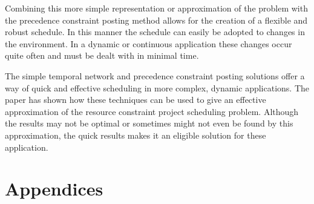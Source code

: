 \documentclass{article}
\theoremstyle{definition}
\begin{document}
Combining this more simple representation or approximation of the problem with the precedence constraint posting method allows for the creation of a flexible and robust schedule.
In this manner the schedule can easily be adopted to changes in the environment.
In a dynamic or continuous application these changes occur quite often and must be dealt with in minimal time.

The simple temporal network and precedence constraint posting solutions offer a way of quick and effective scheduling in more complex, dynamic applications.
The paper has shown how these techniques can be used to give an effective approximation of the resource constraint project scheduling problem.
Although the results may not be optimal or sometimes might not even be found by this approximation, the quick results makes it an eligible solution for these application.

\newpage



\section{Appendices}
\end{document}
